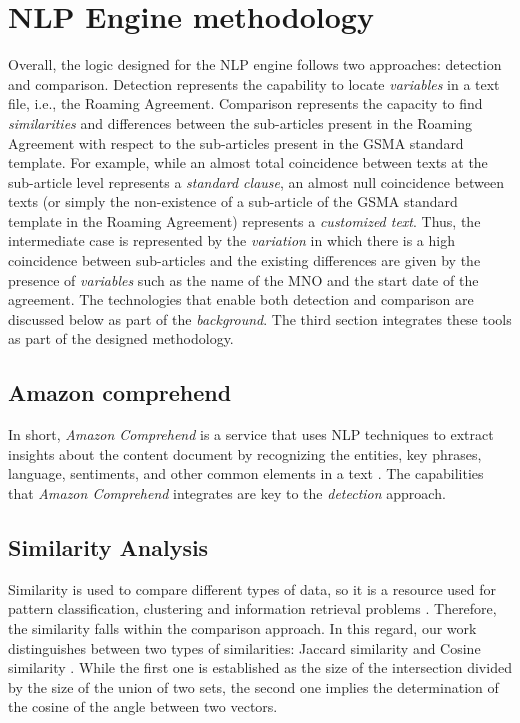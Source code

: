 \documentclass[conference]{style/IEEEtran}
\begin{document}
\section{NLP Engine methodology}
Overall, the logic designed for the NLP engine follows two approaches: detection and comparison. Detection represents the capability to locate \textit{variables} in a text file, i.e., the Roaming Agreement. Comparison represents the capacity to find \textit{similarities} and differences between the sub-articles present in the Roaming Agreement with respect to the sub-articles present in the GSMA standard template. For example, while an almost total coincidence between texts at the sub-article level represents a \textit{standard clause}, an almost null coincidence between texts (or simply the non-existence of a sub-article of the GSMA standard template in the Roaming Agreement) represents a \textit{customized text}. Thus, the intermediate case is represented by the \textit{variation} in which there is a high coincidence between sub-articles and the existing differences are given by the presence of \textit{variables} such as the name of the MNO and the start date of the agreement. The technologies that enable both detection and comparison are discussed below as part of the \textit{background}. The third section integrates these tools as part of the designed methodology.

\subsection{Amazon comprehend}
In short, \textit{Amazon Comprehend} is a service that uses NLP techniques to extract insights about the content document by recognizing  the  entities,  key  phrases,  language,  sentiments,  and  other  common  elements  in  a  text \cite{AWS2021}. The capabilities that \textit{Amazon Comprehend} integrates are key to the \textit{detection} approach.

\subsection{Similarity Analysis}
Similarity is used to compare different types of data, so it is a resource used for pattern classification, clustering and information retrieval problems \cite{7429408}. Therefore, the similarity falls within the comparison approach. In this regard, our work distinguishes between two types of similarities: Jaccard similarity and Cosine similarity \cite{Gupta2018}. While the first one is established as the size of the intersection divided by the size of the union of two sets, the second one implies the determination of the cosine of the angle between two vectors.
\end{document}

